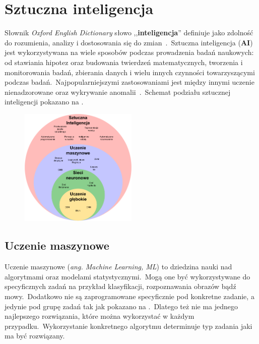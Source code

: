 \chapter{Sztuczna inteligencja}
Słownik \textit{Oxford English Dictionary} słowo ,,\textbf{inteligencja}'' definiuje jako zdolność do rozumienia, analizy i dostosowania się do zmian~\cite{OxfordJuly2023}.\ Sztuczna inteligencja  (\textbf{AI}) jest wykorzystywana na wiele sposobów podczas prowadzenia badań naukowych: od stawiania hipotez oraz budowania twierdzeń matematycznych, tworzenia i monitorowania badań, zbierania danych i wielu innych czynności towarzyszącymi podczas badań.\ Najpopularniejszymi zastosowaniami jest między innymi uczenie nienadzorowane oraz wykrywanie anomalii~\cite{AiScience, Mahesh2018}.\ Schemat podziału sztucznej inteligencji pokazano na .

\begin{figure}[H]
    \centering
    \includegraphics[width=0.5\textwidth]{images/si}
    \label{fig:si-schema}
\end{figure}


\section{Uczenie maszynowe}
Uczenie maszynowe (\textit {ang. Machine Learning, ML}) to dziedzina nauki nad algorytmami oraz modelami statystycznymi.\ Mogą one być wykorzystywane do specyficznych zadań na przykład klasyfikacji, rozpoznawania obrazów bądź mowy.\ Dodatkowo nie są zaprogramowane specyficznie pod konkretne zadanie, a jedynie pod grupę zadań tak jak pokazano na .\ Dlatego też nie ma jednego najlepszego rozwiązania, które można wykorzystać w każdym przypadku.\ Wykorzystanie konkretnego algorytmu determinuje typ zadania jaki ma być rozwiązany.

